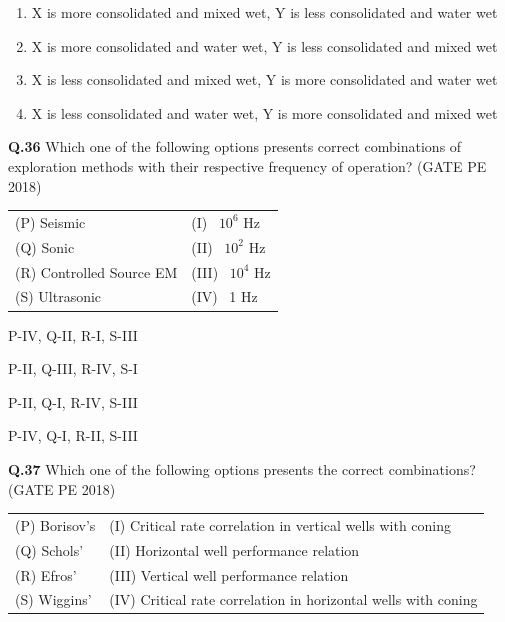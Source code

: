 \documentclass[journal,12pt,onecolumn]{IEEEtran}
\theoremstyle{remark}
\begin{document}
\begin{enumerate} 

	\item X is more consolidated and mixed wet, Y is less consolidated and water wet
	\item X is more consolidated and water wet, Y is less consolidated and mixed wet
	\item X is less consolidated and mixed wet, Y is more consolidated and water wet
	\item X is less consolidated and water wet, Y is more consolidated and mixed wet\\
\end{enumerate}
\noindent\textbf{Q.36} Which one of the following options presents correct combinations of exploration methods with their respective frequency of operation? \hfill (GATE PE 2018)

\vspace{0.3cm}
\begin{tabular}{ll}
(P) Seismic               & (I) ~$10^6$ Hz \\
(Q) Sonic                 & (II) ~$10^2$ Hz \\
(R) Controlled Source EM & (III) ~$10^4$ Hz \\
(S) Ultrasonic            & (IV) ~1 Hz \\
\end{tabular}


\begin{enumerate} 
\begin{multicols}{2}
\item P-IV, Q-II, R-I, S-III \item P-II, Q-III, R-IV, S-I \\
\item P-II, Q-I, R-IV, S-III \item P-IV, Q-I, R-II, S-III \\
\end{multicols}
\end{enumerate}

\pagebreak

\noindent\textbf{Q.37} Which one of the following options presents the correct combinations? \hfill (GATE PE 2018)

\vspace{0.3cm}
\begin{tabular}{ll}
(P) Borisov's  & (I) Critical rate correlation in vertical wells with coning \\
(Q) Schols'    & (II) Horizontal well performance relation \\
(R) Efros'     & (III) Vertical well performance relation \\
(S) Wiggins'   & (IV) Critical rate correlation in horizontal wells with coning 
\end{tabular}
\end{document}
